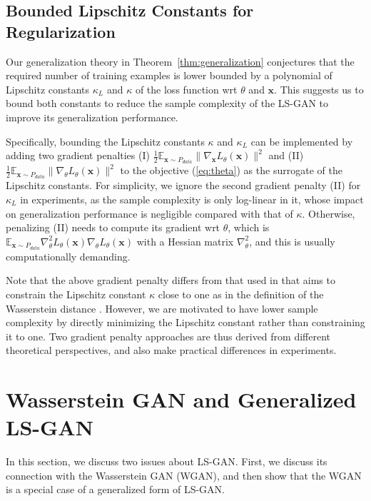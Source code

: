 \documentclass[11pt,fullpage, letterpaper,twoside]{article}
\newcommand{\1}[1]{\mathds{1}_{\left[#1\right]}}
\begin{document}
\subsection{Bounded Lipschitz Constants for Regularization}

Our generalization theory  in Theorem~\ref{thm:generalization} conjectures that the required number of training examples is lower bounded by a polynomial of Lipschitz constants $\kappa_L$ and $\kappa$ of the loss function wrt $\theta$ and $\mathbf x$. This suggests us to bound both constants to reduce the sample complexity of the LS-GAN to improve its generalization performance.



Specifically, bounding the Lipschitz constants $\kappa$ and $\kappa_L$ can be implemented by adding two gradient penalties (I) $\frac{1}{2}\mathbb E_{\mathbf x\sim P_{data}} \|\nabla_\mathbf x L_\theta(\mathbf x)\|^2$ and (II) $\frac{1}{2}\mathbb E_{\mathbf x\sim P_{data}} \|\nabla_{\theta} L_\theta(\mathbf x)\|^2$
to the objective (\ref{eq:theta}) as the surrogate of the Lipschitz constants. For simplicity, we  ignore the second gradient penalty (II) for $\kappa_L$ in experiments, as the sample complexity is only log-linear in it, whose impact on generalization performance is negligible compared with that of $\kappa$. Otherwise, penalizing (II) needs to compute its gradient wrt $\theta$, which is $\mathbb E_{\mathbf x\sim P_{data}} \nabla^2_{\theta} L_\theta(\mathbf x) \nabla_{\theta} L_\theta(\mathbf x)$ with a Hessian matrix $\nabla^2_{\theta}$, and this is usually computationally demanding.

Note that the above gradient penalty differs from that used in \cite{gulrajani2017improved} that aims to constrain the Lipschitz constant $\kappa$ close to one as in the definition of the Wasserstein distance \cite{wgan17}. However, we are motivated to have lower sample complexity by directly minimizing the Lipschitz constant rather than constraining it to one.  Two gradient penalty approaches are thus derived from different theoretical perspectives, and also make practical differences in experiments.




\section{Wasserstein GAN and Generalized LS-GAN}
In this section, we discuss two issues about LS-GAN.  First, we discuss its connection with the Wasserstein GAN (WGAN), and then show that the WGAN is a special case of a generalized form of LS-GAN.
\end{document}
